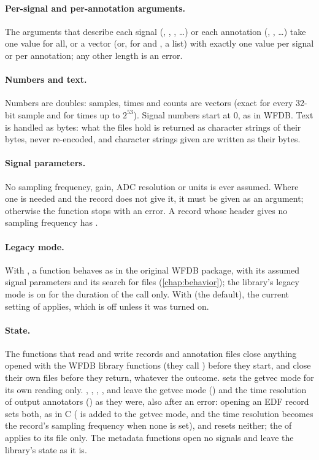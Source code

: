 \paragraph{Per-signal and per-annotation arguments.} The arguments that describe each
signal (, , , \ldots) or each annotation
(, , \ldots) take one value for all, or a vector (or, for
 and , a list) with exactly one value per signal or per
annotation; any other length is an error.

\paragraph{Numbers and text.} Numbers are doubles: samples, times and counts are
 vectors (exact for every 32-bit sample and for times up to $2^{53}$).
Signal numbers start at 0, as in WFDB. Text is handled as bytes: what the files hold is
returned as character strings of their bytes, never re-encoded, and character strings
given are written as their bytes.

\paragraph{Signal parameters.} No sampling frequency, gain, ADC resolution or units is
ever assumed. Where one is needed and the record does not give it, it must be given as an
argument; otherwise the function stops with an error. A record whose header gives no
sampling frequency has .

\paragraph{Legacy mode.} With , a function behaves as in the original
WFDB package, with its assumed signal parameters and its search for files
(\cref{chap:behavior}); the library's legacy mode is on for the duration of the call
only. With  (the default), the current setting of
 applies, which is off unless it was turned on.

\paragraph{State.} The functions that read and write records and annotation files close
anything opened with the WFDB library functions (they call ) before
they start, and close their own files before they return, whatever the outcome.
 sets the getvec mode for its own reading only. ,
, , ,
 and  leave the getvec mode
() and the time resolution of output annotators () as they
were, also after an error: opening an EDF record sets both, as in C (
is added to the getvec mode, and the time resolution becomes the record's sampling
frequency when none is set), and  resets neither; the  of
 applies to its file only. The metadata functions open no
signals and leave the library's state as it is.

